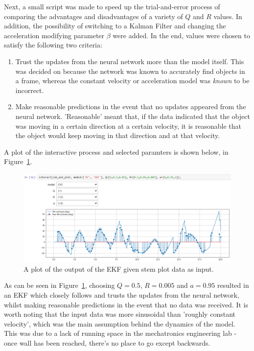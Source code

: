 Next, a small script was made to speed up the trial-and-error process of comparing the advantages and disadvantages of a variety of $Q$ and $R$ values. In addition, the possibility of switching to a Kalman Filter and changing the acceleration modifying parameter $\beta$ were added. In the end, values were chosen to satisfy the following two criteria:

\begin{enumerate}
\item Trust the updates from the neural network more than the model itself. This was decided on because the network was known to accurately find objects in a frame, whereas the constant velocity or acceleration model was \emph{known} to be incorrect.
\item Make reasonable predictions in the event that no updates appeared from the neural network. 'Reasonable' meant that, if the data indicated that the object was moving in a certain direction at a certain velocity, it is reasonable that the object would keep moving in that direction and at that velocity.
\end{enumerate}

A plot of the interactive process and selected paramters is shown below, in Figure~\ref{fig:tuning_Q_R}.

\begin{figure}[h!]
  \centering
  \includegraphics[width=\textwidth]{methodology/tuning_Q_R}
  \caption{\label{fig:tuning_Q_R} A plot of the output of the EKF given stem plot data as input.}
\end{figure}

As can be seen in Figure~\ref{fig:tuning_Q_R}, choosing $Q = 0.5$, $R = 0.005$ and $a = 0.95$ resulted in an EKF which closely follows and trusts the updates from the neural network, whilst making reasonable predictions in the event that no data was received. It is worth noting that the input data was more sinusoidal than 'roughly constant velocity', which was the main assumption behind the dynamics of the model. This was due to a lack of running space in the mechatronics engineering lab - once wall has been reached, there's no place to go except backwards.

